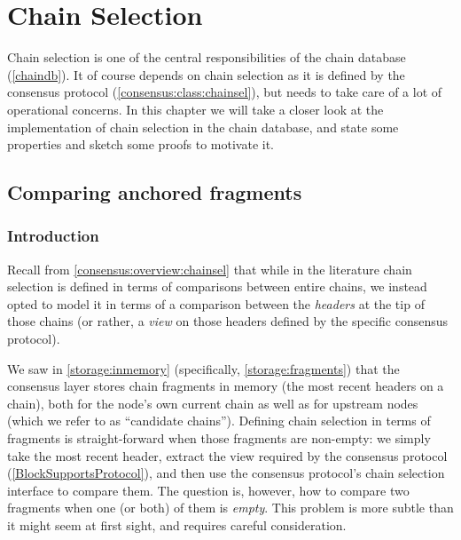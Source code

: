 \newcommand{\chainle}{\ensuremath{\mathrel{\sqsubseteq}}}
\newcommand{\chainlt}{\ensuremath{\mathrel{\sqsubset}}}
\newcommand{\chainnotlt}{\ensuremath{\mathrel{\nsqsubset}}}
\newcommand{\wehave}{.\;}
\newcommand{\suchthat}{.\;}
\newcommand{\app}{\ensuremath{\mathrel{\triangleright}}}
\newcommand{\length}[1]{\ensuremath{\mathrm{length} \; #1}}
\newcommand{\ifthen}[2]{\ensuremath{\mathrm{if} \quad #1 \quad \mathrm{then} \quad #2}}
\renewcommand{\iff}{\ensuremath{\qquad\mathrm{iff}\qquad}}
\newcommand{\candidates}[2]{\ensuremath{\mathsf{candidates}_#1(#2)}}
\newcommand{\blockNo}[1]{\ensuremath{\mathtt{blockNo}(#1)}}

\chapter{Chain Selection}
\label{chainsel}

Chain selection is one of the central responsibilities of the chain database
(\cref{chaindb}). It of course depends on chain selection as it is defined  by
the consensus protocol (\cref{consensus:class:chainsel}), but needs to  take
care of a lot of operational concerns. In this chapter we will take a closer
look at the implementation of chain selection in the chain database, and state
some properties and sketch some proofs to motivate it.

\section{Comparing anchored fragments}
\label{chainsel:fragments}

\subsection{Introduction}

Recall from \cref{consensus:overview:chainsel} that while in the literature
chain selection is defined in terms of comparisons between entire chains, we
instead opted to model it in terms of a comparison between the \emph{headers} at
the tip of those chains (or rather, a \emph{view} on those headers defined by
the specific consensus protocol).

We saw in \cref{storage:inmemory} (specifically, \cref{storage:fragments}) that
the consensus layer stores chain fragments in memory (the most recent headers on
a chain), both for the node's own current chain as well as for upstream nodes
(which we refer to as ``candidate chains''). Defining chain selection in terms
of fragments is straight-forward when those fragments are non-empty: we simply
take the most recent header, extract the view required by the consensus protocol
(\cref{BlockSupportsProtocol}), and then use the consensus protocol's chain
selection interface to compare them. The question is, however, how to compare
two fragments when one (or both) of them is \emph{empty}. This problem is more
subtle than it might seem at first sight, and requires careful consideration.

